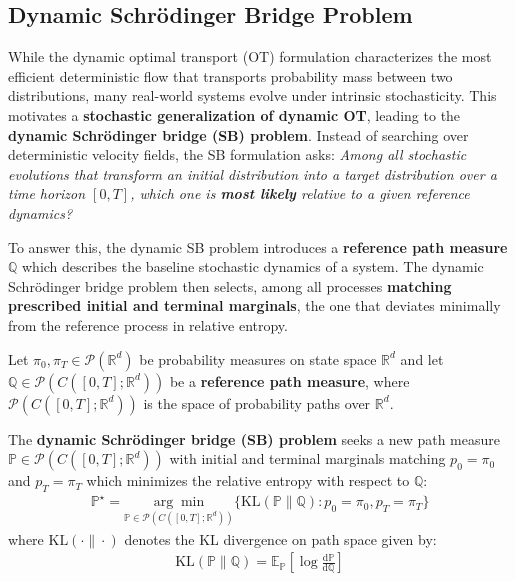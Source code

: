\documentclass{article}
\newcommand{\boldtext}[1]{\textbf{\textcolor{MyGreen}{#1}}}
\begin{document}
\subsection{Dynamic Schrödinger Bridge Problem}
\label{subsec:sb-problem}

While the dynamic optimal transport (OT) formulation characterizes the most efficient deterministic flow that transports probability mass between two distributions, many real-world systems evolve under intrinsic stochasticity. This motivates a \textbf{stochastic generalization of dynamic OT}, leading to the \boldtext{dynamic Schrödinger bridge (SB) problem}. Instead of searching over deterministic velocity fields, the SB formulation asks: \textit{Among all stochastic evolutions that transform an initial distribution into a target distribution over a time horizon $[0,T]$, which one is \textbf{most likely} relative to a given reference dynamics?}

To answer this, the dynamic SB problem introduces a \boldtext{reference path measure} $\mathbb{Q}$ which describes the baseline stochastic dynamics of a system. The dynamic Schrödinger bridge problem then selects, among all processes \textbf{matching prescribed initial and terminal marginals}, the one that deviates minimally from the reference process in relative entropy. 

\begin{definition}\label{def:dynamic-sb-problem}
Let $\pi_0, \pi_T\in \mathcal{P}(\mathbb{R}^d)$ be probability measures on state space $\mathbb{R}^d$ and let $\mathbb{Q}\in \mathcal{P}(C([0,T]; \mathbb{R}^d))$ be a \textbf{reference path measure}, where $\mathcal{P}(C([0,T]; \mathbb{R}^d))$ is the space of probability paths over $\mathbb{R}^d$. 

The \textbf{dynamic Schrödinger bridge (SB) problem} seeks a new path measure $\mathbb{P}\in \mathcal{P}(C([0,T]; \mathbb{R}^d))$ with initial and terminal marginals matching $p_0=\pi_0$ and $p_T=\pi_T$ which minimizes the relative entropy with respect to $\mathbb{Q}$:
\begin{align}
    \mathbb{P}^\star=\underset{\mathbb{P}\in \mathcal{P}(C([0,T]; \mathbb{R}^d))}{\arg\min}\big\{\text{KL}(\mathbb{P}\|\mathbb{Q}):p_0=\pi_0, p_T=\pi_T\big\}\tag{Dynamic SB Problem}\label{eq:dynamic-sb-problem}
\end{align}
where $\text{KL}(\cdot \|\cdot )$ denotes the KL divergence on path space given by:
\begin{align}
    \text{KL}(\mathbb{P}\|\mathbb{Q})=\mathbb{E}_{\mathbb{P}}\left[\log \frac{\mathrm{d}\mathbb{P}}{\mathrm{d}\mathbb{Q}}\right]
\end{align}
\end{definition}
\end{document}
